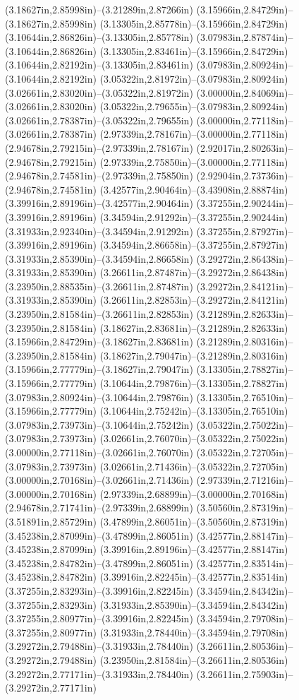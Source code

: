 (3.18627in,2.85998in)--(3.21289in,2.87266in) (3.15966in,2.84729in)--(3.18627in,2.85998in) (3.13305in,2.85778in)--(3.15966in,2.84729in) (3.10644in,2.86826in)--(3.13305in,2.85778in) (3.07983in,2.87874in)--(3.10644in,2.86826in) (3.13305in,2.83461in)--(3.15966in,2.84729in) (3.10644in,2.82192in)--(3.13305in,2.83461in) (3.07983in,2.80924in)--(3.10644in,2.82192in) (3.05322in,2.81972in)--(3.07983in,2.80924in) (3.02661in,2.83020in)--(3.05322in,2.81972in) (3.00000in,2.84069in)--(3.02661in,2.83020in) (3.05322in,2.79655in)--(3.07983in,2.80924in) (3.02661in,2.78387in)--(3.05322in,2.79655in) (3.00000in,2.77118in)--(3.02661in,2.78387in) (2.97339in,2.78167in)--(3.00000in,2.77118in) (2.94678in,2.79215in)--(2.97339in,2.78167in) (2.92017in,2.80263in)--(2.94678in,2.79215in) (2.97339in,2.75850in)--(3.00000in,2.77118in) (2.94678in,2.74581in)--(2.97339in,2.75850in) (2.92904in,2.73736in)--(2.94678in,2.74581in) (3.42577in,2.90464in)--(3.43908in,2.88874in) (3.39916in,2.89196in)--(3.42577in,2.90464in) (3.37255in,2.90244in)--(3.39916in,2.89196in) (3.34594in,2.91292in)--(3.37255in,2.90244in) (3.31933in,2.92340in)--(3.34594in,2.91292in) (3.37255in,2.87927in)--(3.39916in,2.89196in) (3.34594in,2.86658in)--(3.37255in,2.87927in) (3.31933in,2.85390in)--(3.34594in,2.86658in) (3.29272in,2.86438in)--(3.31933in,2.85390in) (3.26611in,2.87487in)--(3.29272in,2.86438in) (3.23950in,2.88535in)--(3.26611in,2.87487in) (3.29272in,2.84121in)--(3.31933in,2.85390in) (3.26611in,2.82853in)--(3.29272in,2.84121in) (3.23950in,2.81584in)--(3.26611in,2.82853in) (3.21289in,2.82633in)--(3.23950in,2.81584in) (3.18627in,2.83681in)--(3.21289in,2.82633in) (3.15966in,2.84729in)--(3.18627in,2.83681in) (3.21289in,2.80316in)--(3.23950in,2.81584in) (3.18627in,2.79047in)--(3.21289in,2.80316in) (3.15966in,2.77779in)--(3.18627in,2.79047in) (3.13305in,2.78827in)--(3.15966in,2.77779in) (3.10644in,2.79876in)--(3.13305in,2.78827in) (3.07983in,2.80924in)--(3.10644in,2.79876in) (3.13305in,2.76510in)--(3.15966in,2.77779in) (3.10644in,2.75242in)--(3.13305in,2.76510in) (3.07983in,2.73973in)--(3.10644in,2.75242in) (3.05322in,2.75022in)--(3.07983in,2.73973in) (3.02661in,2.76070in)--(3.05322in,2.75022in) (3.00000in,2.77118in)--(3.02661in,2.76070in) (3.05322in,2.72705in)--(3.07983in,2.73973in) (3.02661in,2.71436in)--(3.05322in,2.72705in) (3.00000in,2.70168in)--(3.02661in,2.71436in) (2.97339in,2.71216in)--(3.00000in,2.70168in) (2.97339in,2.68899in)--(3.00000in,2.70168in) (2.94678in,2.71741in)--(2.97339in,2.68899in) (3.50560in,2.87319in)--(3.51891in,2.85729in) (3.47899in,2.86051in)--(3.50560in,2.87319in) (3.45238in,2.87099in)--(3.47899in,2.86051in) (3.42577in,2.88147in)--(3.45238in,2.87099in) (3.39916in,2.89196in)--(3.42577in,2.88147in) (3.45238in,2.84782in)--(3.47899in,2.86051in) (3.42577in,2.83514in)--(3.45238in,2.84782in) (3.39916in,2.82245in)--(3.42577in,2.83514in) (3.37255in,2.83293in)--(3.39916in,2.82245in) (3.34594in,2.84342in)--(3.37255in,2.83293in) (3.31933in,2.85390in)--(3.34594in,2.84342in) (3.37255in,2.80977in)--(3.39916in,2.82245in) (3.34594in,2.79708in)--(3.37255in,2.80977in) (3.31933in,2.78440in)--(3.34594in,2.79708in) (3.29272in,2.79488in)--(3.31933in,2.78440in) (3.26611in,2.80536in)--(3.29272in,2.79488in) (3.23950in,2.81584in)--(3.26611in,2.80536in) (3.29272in,2.77171in)--(3.31933in,2.78440in) (3.26611in,2.75903in)--(3.29272in,2.77171in) 